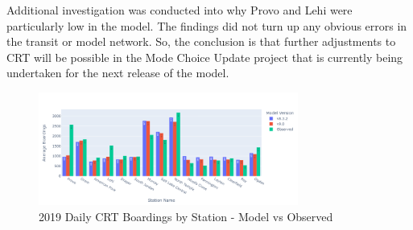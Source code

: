 \documentclass[
  letterpaper,
  DIV=11,
  numbers=noendperiod]{scrreprt}
\begin{document}
Additional investigation was conducted into why Provo and Lehi were
particularly low in the model. The findings did not turn up any obvious
errors in the transit or model network. So, the conclusion is that
further adjustments to CRT will be possible in the Mode Choice Update
project that is currently being undertaken for the next release of the
model.

\begin{figure}[H]

{\centering \includegraphics[width=0.76\textwidth,height=\textheight]{v9x/v900/whats-new/_pictures/pdf-fr-brd.png}

}

\caption{\label{fig-pdf-fr-brd}2019 Daily CRT Boardings by Station -
Model vs Observed}

\end{figure}
\end{document}
